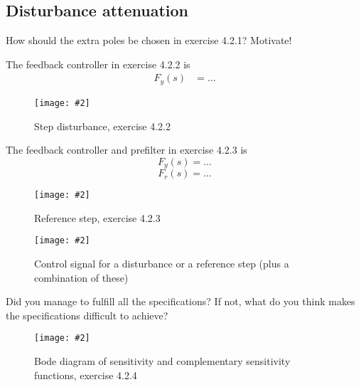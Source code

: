 \documentclass[a4paper,11pt]{article}
\newcommand{\image}[3]{
	\begin{figure}[!ht]
		\centering
	    \texttt{[image: \#2]}
		\caption{#3}
		\label{fig:#2}
	\end{figure}
}
\begin{document}
\subsection{Disturbance attenuation}
\par How should the extra poles be chosen in exercise 4.2.1? Motivate! 

\par \dotfill

\par \dotfill

\par The feedback controller in exercise 4.2.2 is
\begin{align*}
	F_{y}(s) &= \ldots
\end{align*}

	\image{0.5}{system}{Step disturbance, exercise 4.2.2}
	
	The feedback controller and prefilter in exercise 4.2.3 is 
	\[
	F_y(s) = \ldots
	\]
	\[
	F_r(s) = \ldots
	\]
	\image{0.25}{system}{Reference step, exercise 4.2.3}
	\image{0.25}{system}{Control signal for a disturbance or a reference step (plus a combination of these)}

	Did you manage to fulfill all the specifications? If not, what do you think makes the specifications difficult to achieve?
	\par\dotfill\par\dotfill\par
	
	\image{0.25}{system}{Bode diagram of sensitivity and complementary sensitivity functions, exercise 4.2.4}
\end{document}
